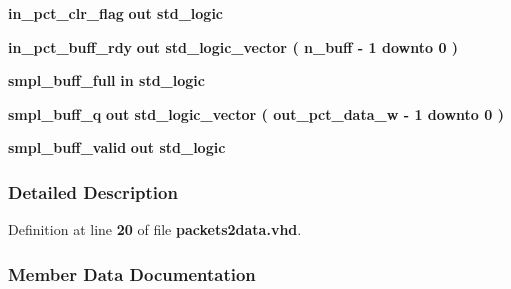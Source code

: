 \begin{DoxyCompactItemize}
\item 
{\bf in\+\_\+pct\+\_\+clr\+\_\+flag}  {\bfseries {\bfseries \textcolor{keywordflow}{out}\textcolor{vhdlchar}{ }}} {\bfseries \textcolor{comment}{std\+\_\+logic}\textcolor{vhdlchar}{ }} 
\item 
{\bf in\+\_\+pct\+\_\+buff\+\_\+rdy}  {\bfseries {\bfseries \textcolor{keywordflow}{out}\textcolor{vhdlchar}{ }}} {\bfseries \textcolor{comment}{std\+\_\+logic\+\_\+vector}\textcolor{vhdlchar}{ }\textcolor{vhdlchar}{(}\textcolor{vhdlchar}{ }\textcolor{vhdlchar}{ }\textcolor{vhdlchar}{ }\textcolor{vhdlchar}{ }{\bfseries {\bf n\+\_\+buff}} \textcolor{vhdlchar}{-\/}\textcolor{vhdlchar}{ } \textcolor{vhdldigit}{1} \textcolor{vhdlchar}{ }\textcolor{keywordflow}{downto}\textcolor{vhdlchar}{ }\textcolor{vhdlchar}{ } \textcolor{vhdldigit}{0} \textcolor{vhdlchar}{ }\textcolor{vhdlchar}{)}\textcolor{vhdlchar}{ }} 
\item 
{\bf smpl\+\_\+buff\+\_\+full}  {\bfseries {\bfseries \textcolor{keywordflow}{in}\textcolor{vhdlchar}{ }}} {\bfseries \textcolor{comment}{std\+\_\+logic}\textcolor{vhdlchar}{ }} 
\item 
{\bf smpl\+\_\+buff\+\_\+q}  {\bfseries {\bfseries \textcolor{keywordflow}{out}\textcolor{vhdlchar}{ }}} {\bfseries \textcolor{comment}{std\+\_\+logic\+\_\+vector}\textcolor{vhdlchar}{ }\textcolor{vhdlchar}{(}\textcolor{vhdlchar}{ }\textcolor{vhdlchar}{ }\textcolor{vhdlchar}{ }\textcolor{vhdlchar}{ }{\bfseries {\bf out\+\_\+pct\+\_\+data\+\_\+w}} \textcolor{vhdlchar}{-\/}\textcolor{vhdlchar}{ } \textcolor{vhdldigit}{1} \textcolor{vhdlchar}{ }\textcolor{keywordflow}{downto}\textcolor{vhdlchar}{ }\textcolor{vhdlchar}{ } \textcolor{vhdldigit}{0} \textcolor{vhdlchar}{ }\textcolor{vhdlchar}{)}\textcolor{vhdlchar}{ }} 
\item 
{\bf smpl\+\_\+buff\+\_\+valid}  {\bfseries {\bfseries \textcolor{keywordflow}{out}\textcolor{vhdlchar}{ }}} {\bfseries \textcolor{comment}{std\+\_\+logic}\textcolor{vhdlchar}{ }} 
\end{DoxyCompactItemize}


\subsubsection{Detailed Description}


Definition at line {\bf 20} of file {\bf packets2data.\+vhd}.



\subsubsection{Member Data Documentation}
